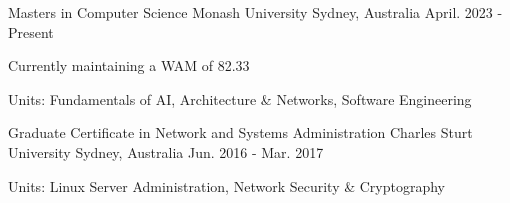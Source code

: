 

\begin{cventries}

  \cventry
    {Masters in Computer Science} %
    {Monash University} %
    {Sydney, Australia} %
    {April. 2023 - Present} %
   {
      \begin{cvitems} %
        \item {Currently maintaining a WAM of 82.33}
        \item {Units: Fundamentals of AI, Architecture \& Networks, Software Engineering}
      \end{cvitems}
    }


  \cventry
    {Graduate Certificate in Network and Systems Administration} %
    {Charles Sturt University} %
    {Sydney, Australia} %
    {Jun. 2016 - Mar. 2017} %
   {
      \begin{cvitems} %
      \item {Units: Linux Server Administration, Network Security \& Cryptography}
      \end{cvitems}
    }

\end{cventries}
